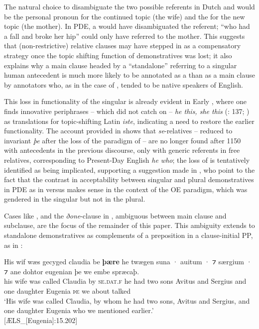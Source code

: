 \documentclass[output=paper,colorlinks,citecolor=brown]{langscibook}
\begin{document}
The natural choice to disambiguate the two possible referents in Dutch and  would be the personal pronoun for the continued topic (the wife) and the  for the new topic (the mother). In PDE, a  would have disambiguated the referent; “who had a fall and broke her hip” could only have referred to the mother. This suggests that (non-restrictive) relative clauses may have stepped in as a compensatory strategy once the topic shifting function of demonstratives was lost; it also explains why a main clause headed by a “standalone”  referring to a singular human antecedent is much more likely to be annotated as a  than as a main clause by annotators who, as in the case of , tended to be native speakers of English. 

This loss in functionality of the singular  is already evident in Early , where one finds innovative periphrases – which did not catch on – \textit{he this, she this} (\citealt{Mustanoja1960}: 137; \citealt{Miura2016}) as translations for topic-shifting Latin \textit{iste}, indicating a need to restore the earlier functionality. The account provided in \citet{Allen2022} shows that \textit{se}-relatives – reduced to invariant \textit{þe} after the loss of the paradigm of  – are no longer found after 1150 with antecedents in the previous discourse, only with generic referents in free relatives, corresponding to Present-Day English \textit{he who}; the loss of  is tentatively identified as being implicated, supporting a suggestion made in \citet{LosvanKemenade2018}, who point to the fact that the contrast in acceptability between singular and plural demonstratives in PDE as in  versus  makes sense in the context of the OE  paradigm, which was gendered in the singular but not in the plural.

Cases like , and the \textit{ðone}{}-clause in , ambiguous between main clause and subclause, are the focus of the remainder of this paper. This ambiguity extends to standalone demonstratives as complements of a preposition in a clause-initial PP, as in :

\ea\label{ex:los:11}
\gll His wif wæs gecyged claudia be \textbf{þære} he \underline{} twægen {suna ·} {auitum ·} ⁊ {særgium ·} ⁊ ane dohtor eugenian þe we embe spræcaþ.\\
his wife was called Claudia by \textsc{se.dat.f} he had two sons Avitus and Sergius and one daughter Eugenia \textsc{þe} we about talked\\
\glt ‘His wife was called Claudia, by whom he had two sons, Avitus and Sergius, and one daughter Eugenia who we mentioned earlier.'\\ \hfill [ÆLS\_[Eugenia]:15.202]
\z
\end{document}
